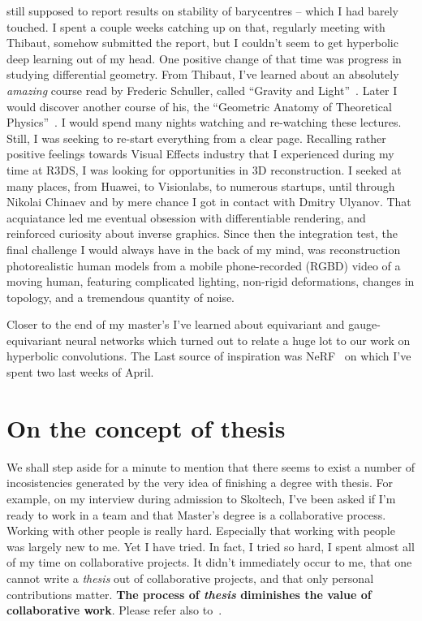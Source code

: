 still supposed to report results on stability of barycentres -- which I had
barely touched. I spent a couple weeks catching up on that, regularly meeting
with Thibaut, somehow submitted the report, but I couldn't seem to get
hyperbolic deep learning out of my head. One positive change of that time was
progress in studying differential geometry. From Thibaut, I've learned about an
absolutely \emph{amazing} course read by Frederic Schuller, called ``Gravity
and Light''~\citep{gravityLight}.  Later I would discover another course of
his, the ``Geometric Anatomy of Theoretical
Physics''~\citep{geometricAnatomy}. I would spend many nights watching and
re-watching these lectures.
Still, I was seeking to re-start everything from a clear page. Recalling rather
positive feelings towards Visual Effects industry that I experienced during my
time at R3DS, I was looking for opportunities in 3D reconstruction. I seeked at
many places, from Huawei, to Visionlabs, to numerous startups, until through
Nikolai Chinaev and by mere chance I got in contact with Dmitry Ulyanov.  That
acquiatance led me eventual obsession with differentiable rendering, and
reinforced curiosity about inverse graphics. Since then the integration test,
the final challenge I would always have in the back of my mind, was
reconstruction photorealistic human models from a mobile phone-recorded (RGBD)
video of a moving human, featuring complicated lighting, non-rigid
deformations, changes in topology, and a tremendous quantity of noise.

Closer to the end of my master's I've learned about equivariant and
gauge-equivariant neural networks which turned out to relate a huge lot to our
work on hyperbolic convolutions. The Last source of inspiration was
NeRF~\cite{nerf} on which I've spent two last weeks of April.

\section*{On the concept of thesis}

We shall step aside for a minute to mention that there seems to exist a number
of incosistencies generated by the very idea of finishing a degree with thesis.
For example, on my interview during admission to Skoltech, I've been asked if
I'm ready to work in a team and that Master's degree is a collaborative
process. Working with other people is really hard. Especially that working with
people was largely new to me. Yet I have tried. In fact, I tried so hard, I
spent almost all of my time on collaborative projects. It didn't immediately
occur to me, that one cannot write a \emph{thesis} out of collaborative
projects, and that only personal contributions matter.
\textbf{The process of \emph{thesis} diminishes the value of collaborative work}.
Please refer also to~\citet{phdBullshit}.

